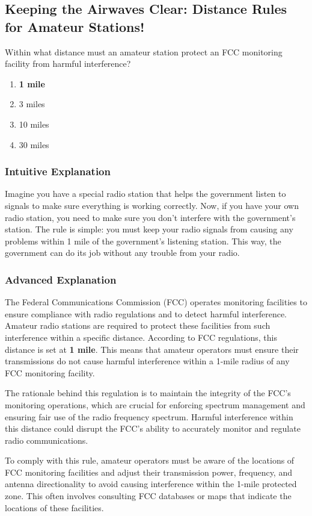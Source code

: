 \subsection{Keeping the Airwaves Clear: Distance Rules for Amateur Stations!}

\begin{tcolorbox}[colback=gray!10!white,colframe=black!75!black,title=E1B03] Within what distance must an amateur station protect an FCC monitoring facility from harmful interference?
    \begin{enumerate}[label=\Alph*)]
        \item \textbf{1 mile}
        \item 3 miles
        \item 10 miles
        \item 30 miles
    \end{enumerate}
\end{tcolorbox}

\subsubsection{Intuitive Explanation}
Imagine you have a special radio station that helps the government listen to signals to make sure everything is working correctly. Now, if you have your own radio station, you need to make sure you don’t interfere with the government’s station. The rule is simple: you must keep your radio signals from causing any problems within 1 mile of the government’s listening station. This way, the government can do its job without any trouble from your radio.

\subsubsection{Advanced Explanation}
The Federal Communications Commission (FCC) operates monitoring facilities to ensure compliance with radio regulations and to detect harmful interference. Amateur radio stations are required to protect these facilities from such interference within a specific distance. According to FCC regulations, this distance is set at \textbf{1 mile}. This means that amateur operators must ensure their transmissions do not cause harmful interference within a 1-mile radius of any FCC monitoring facility.

The rationale behind this regulation is to maintain the integrity of the FCC's monitoring operations, which are crucial for enforcing spectrum management and ensuring fair use of the radio frequency spectrum. Harmful interference within this distance could disrupt the FCC's ability to accurately monitor and regulate radio communications.

To comply with this rule, amateur operators must be aware of the locations of FCC monitoring facilities and adjust their transmission power, frequency, and antenna directionality to avoid causing interference within the 1-mile protected zone. This often involves consulting FCC databases or maps that indicate the locations of these facilities.

